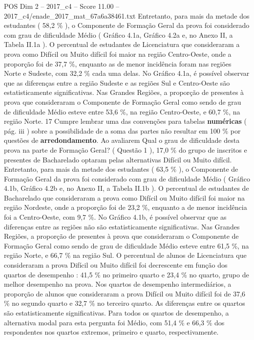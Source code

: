 \begin{textsample}{POS Dim 2 – 2017\_c4 – Score 11.00 – 2017\_c4/enade\_2017\_mat\_67a6a38461.txt}
Entretanto, para mais da metade dos estudantes ( 58,2 \% ), o Componente de Formação Geral da prova foi considerado com grau de dificuldade Médio ( Gráfico 4.1a, Gráfico 4.2a e, no Anexo II, a Tabela II.1a ).
O percentual de estudantes de Licenciatura que consideraram a prova como Difícil ou Muito difícil foi maior na região Centro-Oeste, onde a proporção foi de 37,7 \%, enquanto as de menor incidência foram nas regiões Norte e Sudeste, com 32,2 \% cada uma delas.
No Gráfico 4.1a, é possível observar que as diferenças entre a região Sudeste e as regiões Sul e Centro-Oeste são estatisticamente significativas.
Nas Grandes Regiões, a proporção de presentes à prova que consideraram o Componente de Formação Geral como sendo de grau de dificuldade Médio esteve entre 53,6 \%, na região Centro-Oeste, e 60,7 \%, na região Norte. 17 Cumpre lembrar uma das convenções para tabelas \textbf{numéricas} ( pág. iii ) sobre a possibilidade de a soma das partes não resultar em 100 \% por questões de \textbf{arredondamento}.
Ao avaliarem Qual o grau de dificuldade desta prova na parte de Formação Geral? ( Questão 1 ), 17,0 \% do grupo de inscritos e presentes de Bacharelado optaram pelas alternativas Difícil ou Muito difícil.
Entretanto, para mais da metade dos estudantes ( 63,5 \% ), o Componente de Formação Geral da prova foi considerado com grau de dificuldade Médio ( Gráfico 4.1b, Gráfico 4.2b e, no Anexo II, a Tabela II.1b ).
O percentual de estudantes de Bacharelado que consideraram a prova como Difícil ou Muito difícil foi maior na região Nordeste, onde a proporção foi de 23,2 \%, enquanto a de menor incidência foi a Centro-Oeste, com 9,7 \%.
No Gráfico 4.1b, é possível observar que as diferenças entre as regiões não são estatisticamente significativas.
Nas Grandes Regiões, a proporção de presentes à prova que consideraram o Componente de Formação Geral como sendo de grau de dificuldade Médio esteve entre 61,5 \%, na região Norte, e 66,7 \% na região Sul.
O percentual de alunos de Licenciatura que consideraram a prova Difícil ou Muito difícil foi decrescente em função dos quartos de desempenho : 41,5 \% no primeiro quarto e 23,4 \% no quarto, grupo de melhor desempenho na prova.
Nos quartos de desempenho intermediários, a proporção de alunos que consideraram a prova Difícil ou Muito difícil foi de 37,6 \% no segundo quarto e 32,7 \% no terceiro quarto.
As diferenças entre os quartos são estatisticamente significativas.
Para todos os quartos de desempenho, a alternativa modal para esta pergunta foi Médio, com 51,4 \% e 66,3 \% dos respondentes nos quartos extremos, primeiro e quarto, respectivamente.

\end{textsample}
